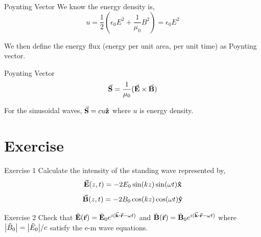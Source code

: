 \documentclass{beamer}
\begin{document}
\begin{frame}{Poynting Vector}
    We know the energy density is,
    \begin{equation}
        u = \frac{1}{2} \left( \epsilon_0 E^2 + \frac{1}{\mu_0} B^2 \right) = \epsilon_0 E^2
    \end{equation}

    We then define the energy flux (energy per unit area, per unit time) as Poynting vector.
    
    \begin{block}{Poynting Vector}
        \begin{equation}
            \va{S} = \frac{1}{\mu_0} (\va{E} \times \va{B})
        \end{equation}
    \end{block}

    For the sinusoidal waves, $\va{S} = cu \vu{z}$ where $u$ is energy density.
\end{frame}


\section{Exercise}


\begin{frame}{Exercise 1}
Calculate the intensity of the standing wave represented by,
\begin{equation}
    \va{E}(z, t) = -2E_0 \sin(kz)\sin(\omega t) \vu{x}
\end{equation}
\begin{equation}
    \va{B}(z, t) = -2B_0 \cos(kz)\cos(\omega t) \vu{y}
\end{equation}

\end{frame}


\begin{frame}{Exercise 2}
Check that $\tilde{\vb{E}}(\va{r}) = \tilde{\vb{E}}_0 e^{i(\va{k} \vdot \va{r} - \omega t)}$ and $\tilde{\vb{B}}(\va{r}) = \tilde{\vb{B}}_0 e^{i(\va{k} \vdot \va{r} - \omega t)}$ where $\abs{\tilde{B}_0} = \abs{\tilde{E}_0} / c$ satisfy the e-m wave equations.
\end{frame}



\end{document}

